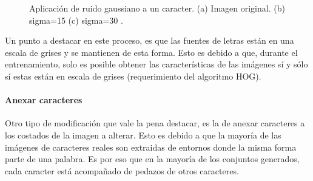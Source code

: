 		\begin{figure}[htbp]
			\centering
			\caption[Ruido Gaussiano en un caracter]{Aplicación de ruido gaussiano a un caracter. (a) Imagen original. (b) sigma=15  (c) sigma=30 .}
			\label{fig: Ruido Gaussiano}
		\end{figure}
			
			Un punto a destacar en este proceso, es que las fuentes de letras están en una escala de grises y se mantienen de esta forma. Esto es debido a que, durante el entrenamiento, solo es posible obtener las características de las imágenes sí y sólo sí estas están en escala de grises (requerimiento del algoritmo HOG). 
			
		\paragraph{Anexar caracteres}
					
			Otro tipo de modificación que vale la pena destacar, es la de anexar caracteres a los costados de la imagen a alterar. Esto es debido a que la mayoría de las imágenes de caracteres reales son extraidas de entornos donde la misma forma parte de una palabra. Es por eso que en la mayoría de los conjuntos generados, cada caracter está acompañado de pedazos de otros caracteres.
			
